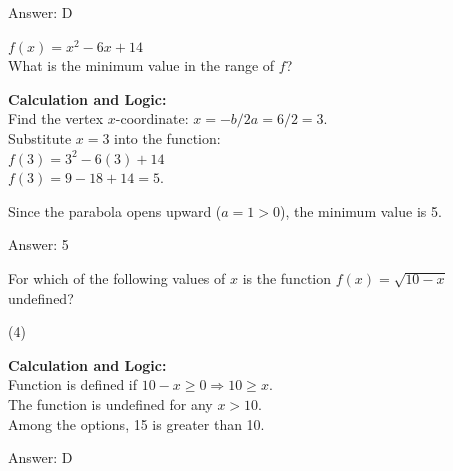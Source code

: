 \documentclass[11pt,paper=a4,answers]{exam}
\begin{document}
\begin{questions}
\begin{solution}
\vspace{30pt}

Answer: \colorbox{yellow!100}{D}
\end{solution}

\vspace{40pt}

\question
$f(x) = x^2 - 6x + 14$ \\
What is the minimum value in the range of $f$?

\begin{solution}
\textbf{Calculation and Logic:} \\
Find the vertex $x$-coordinate: $x = -b/2a = 6/2 = 3$. \\
Substitute $x=3$ into the function: \\
$f(3) = 3^2 - 6(3) + 14$ \\
$f(3) = 9 - 18 + 14 = 5$.

\vspace{15pt}

Since the parabola opens upward ($a=1 > 0$), the minimum value is 5.

\vspace{30pt}

Answer: \colorbox{yellow!100}{5}
\end{solution}

\vspace{40pt}

\question
For which of the following values of $x$ is the function $f(x) = \sqrt{10-x}$ undefined?
\begin{tasks}(4)
\end{tasks}

\begin{solution}
\textbf{Calculation and Logic:} \\
Function is defined if $10 - x \geq 0 \Rightarrow 10 \geq x$. \\
The function is undefined for any $x > 10$. \\
Among the options, 15 is greater than 10.

\vspace{30pt}

Answer: \colorbox{yellow!100}{D}
\end{solution}

\vspace{40pt}


\end{questions}
\end{document}
